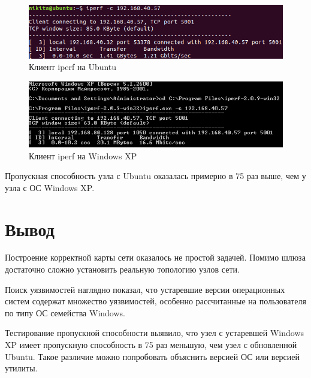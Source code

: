 \documentclass[14pt,a4paper,report]{report}
\begin{document}
\begin{figure}[h!]
	\centering
	\includegraphics[scale = 0.80]{images/3_1.png}
	\caption{Клиент iperf на Ubuntu}
	\label{image:11}
\end{figure}

\begin{figure}[h!]
	\centering
	\includegraphics[scale = 0.80]{images/3_2.png}
	\caption{Клиент iperf на Windows XP}
	\label{image:12}
\end{figure}

Пропускная способность узла с Ubuntu оказалась примерно в 75 раз выше, чем у узла с ОС Windows XP.

\section{Вывод}

Построение корректной карты сети оказалось не простой задачей. Помимо шлюза достаточно сложно установить реальную топологию узлов сети.

Поиск уязвимостей наглядно показал, что устаревшие версии операционных систем содержат множество уязвимостей, особенно рассчитанные на пользователя по типу ОС семейства Windows.

Тестирование пропускной способности выявило, что узел с устаревшей Windows XP имеет пропускную способность в 75 раз меньшую, чем узел с обновленной Ubuntu. Такое различие можно попробовать объяснить версией ОС или версией утилиты.
\end{document}
